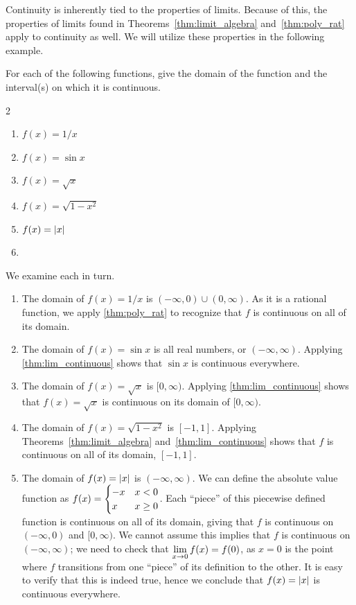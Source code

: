 Continuity is inherently tied to the properties of limits. Because of this, the properties of limits found in Theorems~\ref{thm:limit_algebra} and~\ref{thm:poly_rat}
apply to continuity as well. We will utilize these properties in the following example.

\begin{example}\label{ex_cont_funct1}%
For each of the following functions, give the domain of the function and the interval(s) on which it is continuous.
\begin{multicols}{2}
	\begin{enumerate}
		\item	$f(x) = 1/x$
		\item	$f(x) = \sin x$
		\item	$f(x) = \sqrt{x}$
		\item	$f(x) = \sqrt{1-x^2}$
		\item	$f(x) = \left\lvert x \right\rvert$
		\item[]
	\end{enumerate}
\end{multicols}
\solution
We examine each in turn.
\begin{enumerate}
	\item	The domain of $f(x) = 1/x$ is $(-\infty,0) \cup (0,\infty)$. As it is a rational function, we apply \autoref{thm:poly_rat} to recognize that $f$ is continuous on all of its domain.
	\item	The domain of $f(x) = \sin x$ is all real numbers, or $(-\infty,\infty)$. Applying \autoref{thm:lim_continuous} shows that $\sin x$ is continuous everywhere.
	\item	The domain of $f(x) = \sqrt{x}$ is $[0,\infty)$. Applying \autoref{thm:lim_continuous} shows that $f(x) = \sqrt{x}$ is continuous on its domain of $[0,\infty)$.
	\item	The domain of $f(x) = \sqrt{1-x^2}$ is $[-1,1]$. Applying Theorems~\ref{thm:limit_algebra} and~\ref{thm:lim_continuous} shows that $f$ is continuous on all of its domain, $[-1,1]$.
	\item	The domain of $f(x) = \left\lvert x \right\rvert$ is $(-\infty,\infty)$. We can define the absolute value function as $\displaystyle f(x) = \begin{cases}-x & x<0 \\ x & x\geq 0\end{cases}$. Each ``piece'' of this piecewise defined function is continuous on all of its domain, giving that $f$ is continuous on $(-\infty,0)$ and $[0,\infty)$. We cannot assume this implies that $f$ is continuous on $(-\infty,\infty)$; we need to check that $\displaystyle \lim_{x\to 0}f(x) = f(0)$, as $x=0$ is the point where $f$ transitions from one ``piece'' of its definition to the other. It is easy to verify that this is indeed true, hence we conclude that $f(x) = \left\lvert x \right\rvert$ is continuous everywhere.
\end{enumerate}
\end{example}

